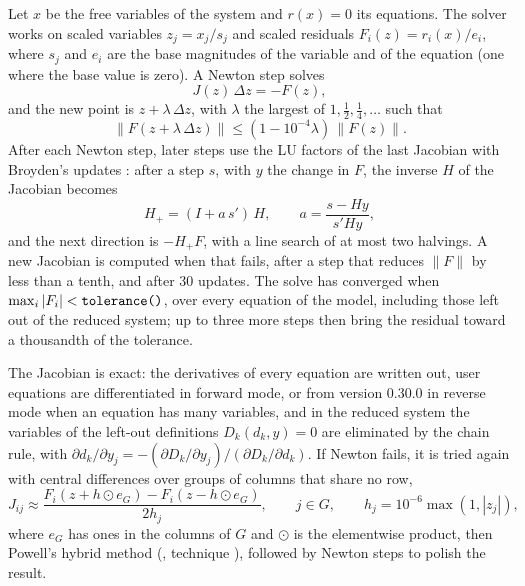 
Let $x$ be the free variables of the system and $r(x) = 0$ its equations. The
solver works on scaled variables $z_j = x_j / s_j$ and scaled residuals
$F_i(z) = r_i(x) / e_i$, where $s_j$ and $e_i$ are the base magnitudes of the
variable and of the equation (one where the base value is zero). A Newton step
solves
\begin{equation*}
J(z)\,\Delta z = -F(z),
\end{equation*}
and the new point is $z + \lambda\,\Delta z$, with $\lambda$ the largest of
$1, \tfrac12, \tfrac14, \dots$ such that
\begin{equation*}
\lVert F(z + \lambda\,\Delta z)\rVert \le (1 - 10^{-4}\lambda)\,\lVert F(z)\rVert .
\end{equation*}
After each Newton step, later steps use the LU factors of the last
Jacobian with Broyden's updates \citep{broyden1965, kelley1995}: after a step
$s$, with $y$ the change in $F$, the inverse $H$ of the Jacobian becomes
\begin{equation*}
H_+ = (I + a\, s')\, H, \qquad a = \frac{s - H y}{s' H y},
\end{equation*}
and the next direction is $-H_+ F$, with a line search of at most two
halvings. A new Jacobian is computed when that fails, after a step that
reduces $\lVert F\rVert$ by less than a tenth, and after 30 updates. The solve has converged when $\max_i |F_i| <
\text{\texttt{tolerance()}}$, over every equation of the model, including
those left out of the reduced system; up to three more steps then bring the
residual toward a thousandth of the tolerance.

The Jacobian is exact: the derivatives of every equation are written out,
user equations are differentiated in forward mode, or from version 0.30.0
in reverse mode when an equation has many variables, and in the reduced system
the variables of the left-out definitions $D_k(d_k, y) = 0$ are eliminated
by the chain rule, with $\partial d_k / \partial y_j = -(\partial D_k /
\partial y_j) / (\partial D_k / \partial d_k)$. If Newton fails, it is tried
again with central differences over groups of columns that share no row,
\begin{equation*}
J_{ij} \approx \frac{F_i(z + h \odot e_G) - F_i(z - h \odot e_G)}{2 h_j}, \qquad j \in G,
\qquad h_j = 10^{-6} \max(1, |z_j|),
\end{equation*}
where $e_G$ has ones in the columns of $G$ and $\odot$ is the elementwise
product, then Powell's hybrid method (, technique
), followed by Newton steps to polish the result.

